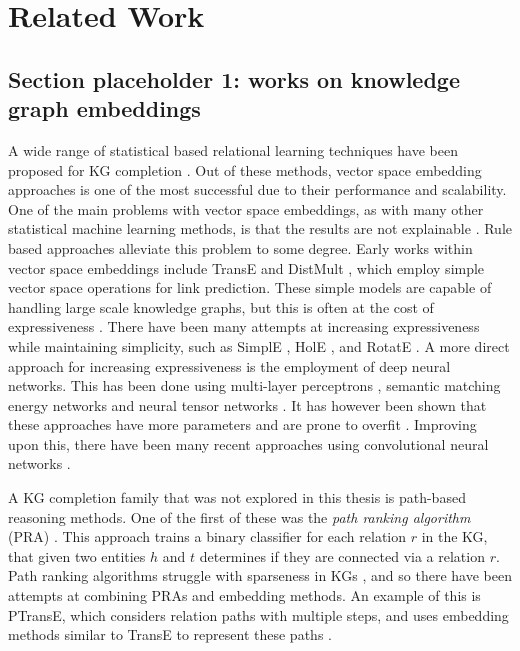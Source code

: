 \chapter{Related Work}
\section{Section placeholder 1: works on knowledge graph embeddings}

A wide range of statistical based relational learning techniques have been proposed for KG completion \cite{nickel2015review}. Out of these methods, vector space embedding approaches is one of the most successful due to their performance and scalability. One of the main problems with vector space embeddings, as with many other statistical machine learning methods, is that the results are not explainable \cite{bonatti2019knowledge}. Rule based approaches alleviate this problem to some degree. Early works within vector space embeddings include TransE \cite{TransE} and DistMult \cite{yang2014embedding}, which employ simple vector space operations for link prediction. These simple models are capable of handling large scale knowledge graphs, but this is often at the cost of expressiveness \cite{dettmers2018convolutional}. There have been many attempts at increasing expressiveness while maintaining simplicity, such as SimplE \cite{SimplE}, HolE \cite{holE}, and RotatE \cite{rotatE}. A more direct approach for increasing expressiveness is the employment of deep neural networks. This has been done using multi-layer perceptrons \cite{dong2014knowledge}, semantic matching energy networks \cite{bordes2014semantic} and neural tensor networks \cite{socher2013reasoning}. It has however been shown that these approaches have more parameters and are prone to overfit \cite{nickel2015review}. Improving upon this, there have been many recent approaches using convolutional neural networks \cite{dettmers2018convolutional, nguyen2017novel, jiang2019adaptive, jiang2021kernel} .

A KG completion family that was not explored in this thesis is path-based reasoning methods. One of the first of these was the \textit{path ranking algorithm} (PRA) \cite{lao2011random}. This approach trains a binary classifier for each relation $r$ in the KG, that given two entities $h$ and $t$ determines if they are connected via a relation $r$. Path ranking algorithms struggle with sparseness in KGs \cite{ma2019elpkg}, and so there have been attempts at combining PRAs and embedding methods. An example of this is PTransE, which considers relation paths with multiple steps, and uses embedding methods similar to TransE to represent these paths \cite{lin2015modeling}. 


